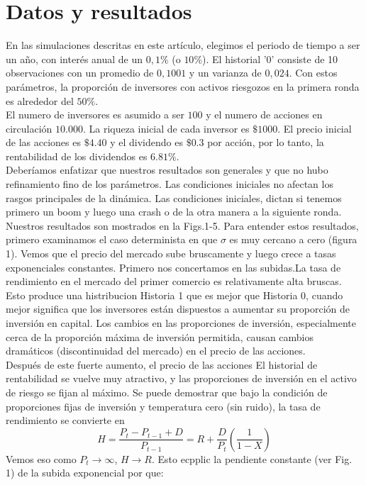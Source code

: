 \documentclass[12pt,a4paper]{article}
\begin{document}
\section{Datos y resultados}
\quad En las simulaciones descritas en este artículo, elegimos el periodo de tiempo a ser un año, con interés anual de un $0,1\%$ (o $10\%$). El historial '0' consiste de 10 observaciones con un promedio de $0,1001$ y un varianza de $0,024$. Con estos parámetros, la proporción de inversores con activos riesgozos en la primera ronda es alrededor del $50\%$.\\
\quad El numero de inversores es asumido a ser $100$ y el numero de acciones en circulación $10.000$. La riqueza inicial de cada inversor es $\$ 1000$. El precio inicial de las acciones es $\$4.40$ y el dividendo es $\$ 0.3$ por acción, por lo tanto, la rentabilidad de los dividendos es $6.81\%$.\\
\quad Deberíamos enfatizar que nuestros resultados son generales y que no hubo refinamiento fino de los parámetros. Las condiciones iniciales no afectan los rasgos principales de la dinámica. Las condiciones iniciales, dictan si tenemos primero un boom y luego una crash o de la otra manera a la siguiente ronda.\\
\quad Nuestros resultados son mostrados en la Figs.1-5. Para entender estos resultados, primero examinamos el caso determinista en que $\sigma$ es muy cercano a cero (figura 1). Vemos que el precio del mercado sube bruscamente y luego crece a tasas  exponenciales constantes. Primero nos concertamos en las subidas.La tasa de rendimiento en el mercado del primer comercio es relativamente alta bruscas. Esto produce una histribucion Historia 1 que es mejor que Historia 0, cuando mejor significa que los inversores están dispuestos a aumentar su proporción de inversión en capital. Los cambios en las proporciones de inversión, especialmente cerca de la proporción máxima de inversión permitida, causan cambios dramáticos (discontinuidad del mercado) en el precio de las acciones.\\
\quad Después de este fuerte aumento, el precio de las acciones El historial de rentabilidad se vuelve muy atractivo, y las proporciones de inversión en el activo de riesgo se fijan al máximo. Se puede demostrar que bajo la condición de proporciones fijas de inversión y temperatura cero (sin ruido), la tasa de rendimiento se convierte en
$$
H=\frac{P_t-P_{t-1}+D}{P_{t-1}}=R+\frac{D}{P_t}\left(\frac{1}{1-X}\right)
$$
\quad Vemos eso como $P_t\rightarrow \infty$, $H\rightarrow R$. Esto ecpplic la pendiente constante (ver Fig. 1) de la subida exponencial por que:
\end{document}
